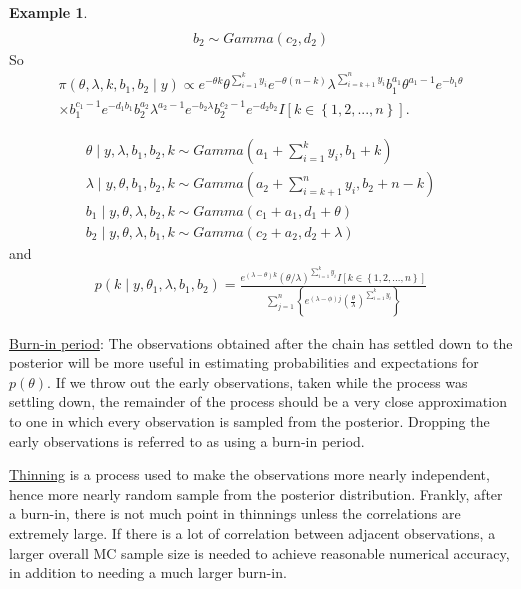 \documentclass[lecture,12pt,]{pcms-l}
\numberwithin{section}{chapter}
\numberwithin{equation}{chapter}
\theoremstyle{plain}
\theoremstyle{definition}
\newtheorem{example}{Example}[section]
\theoremstyle{definition}
\begin{document}
\begin{example}
\begin{equation*}
\begin{split}
\\
b_2 \sim Gamma(c_2,d_2)
\end{split}
\end{equation*}
So
\begin{equation*}
\begin{split}
\pi(\theta, \lambda, k, b_1, b_2\mid y) \propto  e^{- \theta k} \theta^{\sum_{i=1}^{k}y_i} e^{- \theta( n-k)}  \lambda^{ \sum_{i=k+1}^{n}y_i}b_{1}^{a_1}\theta^{a_1-1}e^{-b_1 \theta}
\\
\times b_{1}^{c_1-1}e^{-d_1 b_1}b_{2}^{a_2}\lambda^{ a_2-1}e^{-b_2 \lambda}b_{2}^{c_2 -1}e^{-d_2 b_2}I \left [ k \in \left \{ 1,2,...,n \right \} \right ].
\end{split}
\end{equation*}

\begin{equation*}
\begin{split}
\theta \mid y,\lambda, b_1, b_2, k \sim Gamma(a_1+\sum_{i=1}^{k}y_i,b_1+k)
\\
\lambda \mid y,\theta, b_1, b_2, k \sim Gamma(a_2+\sum_{i=k+1}^{n}y_i,b_2+n-k)
\\
b_1 \mid y,\theta,\lambda, b_2, k \sim Gamma(c_1+a_1,d_1+\theta)
\\
b_2 \mid y,\theta,\lambda, b_1, k \sim Gamma(c_2+a_2,d_2+\lambda)
\end{split}
\end{equation*}
and 
\begin{equation*}
\begin{split}
p(k \mid y, \theta_1, \lambda, b_1,b_2) = \frac{e^{( \lambda-\theta)k}(\theta/\lambda)^{\sum_{i=1}^{k}y_i}I \left [ k \in \left \{ 1,2,...,n \right \} \right ]}{\sum_{j=1}^{n}\left \{ e^{(\lambda- \phi)j} (\frac{\theta}{\lambda})^{\sum_{i=1}^{k}y_i} \right \}}
\end{split}
\end{equation*}
\end{example}

\underline{Burn-in period}: The observations obtained after the chain has settled down to the posterior will be more useful in estimating probabilities and expectations for $p(\theta)$. If we throw out the early observations, taken while the process was settling down, the remainder of the process should be a very close approximation to one in which every observation is sampled from the posterior. Dropping the early observations is referred to as using a burn-in period.

\underline{Thinning} is a process used to make the observations more nearly independent, hence more nearly random sample from the posterior distribution. Frankly, after a burn-in, there is not much point in thinnings unless the correlations are extremely large. If there is a lot of correlation between adjacent observations, a larger overall MC sample size is needed to achieve reasonable numerical accuracy, in addition to needing a much larger burn-in.
 
\end{document}
